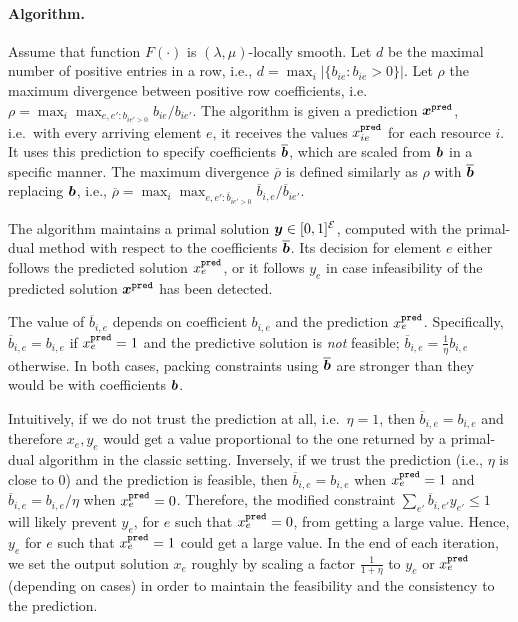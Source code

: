 \paragraph{Algorithm.} 
Assume that function $F(\cdot)$ is $(\lambda, \mu)$-locally smooth.
Let $d$ be the maximal number of positive entries in a row, i.e., $d = \max_{i} |\{b_{ie}: b_{ie} > 0\}|$.  
Let $\rho$ the maximum divergence between positive row coefficients, i.e.\ $\rho = \max_{i} \max_{e,e': b_{ie' > 0}} b_{ie} / b_{ie'}$.   
The algorithm is given a prediction $\bm{x}^{\texttt{pred}}$, i.e.\ with every arriving element $e$, it receives the values $x^{\texttt{pred}}_{ie}$ for each resource $i$.  It uses this prediction to specify coefficients $\overline{\bm{b}}$, which are scaled from $\bm{b}$ in a specific manner.  The maximum divergence $\overline \rho$ is defined similarly as $\rho$ with $\overline{\bm{b}}$ replacing $\bm{b}$, i.e., $\overline{\rho} = \max_{i} \max_{e,e': \overline{b}_{ie' > 0}} \overline{b}_{i,e} / \overline{b}_{ie'}$.

The algorithm maintains a primal solution $\bm{y}\in[0,1]^{\cal E}$, computed with the primal-dual method with respect to the coefficients $\overline {\bm{b}}$. Its decision for element $e$ either follows the predicted solution $x^{\texttt{pred}}_e$, or it follows $y_{e}$ in case infeasibility of the predicted solution $\bm{x}^{\texttt{pred}}$ has been detected.

The value of $\overline{b}_{i,e}$ depends on coefficient $b_{i,e}$ and 
the prediction $x^{\texttt{pred}}_e$. Specifically, $\overline{b}_{i,e} = b_{i,e}$ if
$x^{\texttt{pred}}_{e} = 1$ and the predictive solution is \emph{not} feasible; $\overline{b}_{i,e} = \frac{1}{\eta} b_{i,e}$ otherwise. In both cases, packing constraints using $\overline{\bm{b}}$ are stronger than they would be with coefficients $\bm{b}$.

Intuitively, if we do not trust the prediction at all, i.e.\ $\eta=1$, then 
$\overline{b}_{i,e} = b_{i,e}$ and therefore $x_{e}, y_{e}$ would get a value proportional to the one returned by a primal-dual algorithm
in the classic setting.
Inversely, if we trust the prediction (i.e., $\eta$ is close to 0) and the prediction is feasible, then 
$\overline{b}_{i,e} = b_{i,e}$ when $x^{\texttt{pred}}_{e} = 1$ and $\overline{b}_{i,e} = b_{i,e}/\eta$ when 
$x^{\texttt{pred}}_{e} = 0$. Therefore, the modified constraint
$\sum_{e'} \overline{b}_{i,e'} y_{e'} \leq 1$ will likely prevent $y_{e}$, for $e$ such that $x^{\texttt{pred}}_{e} = 0$, 
from getting a large value. Hence, $y_{e}$ for $e$ such that $x^{\texttt{pred}}_{e} = 1$ could get a large value.
In the end of each iteration, we set the output solution $x_{e}$ roughly by scaling a factor $\frac{1}{1+\eta}$ to  $y_{e}$ or $x^{\texttt{pred}}_{e}$
(depending on cases)
in order to maintain the feasibility and the consistency to the prediction.


